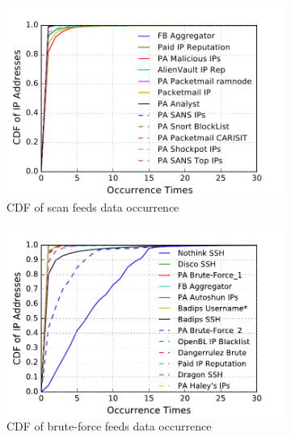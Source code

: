 \begin{figure}[t!]
\centering
\begin{subfigure}{0.33\textwidth}
\includegraphics[width=\linewidth]{images/scan_occurrence.pdf}
\caption{CDF of scan feeds data occurrence}
\label{fig:scan_occurrence}
\end{subfigure}\hspace*{\fill}
\begin{subfigure}{0.33\textwidth}
\includegraphics[width=\linewidth]{images/brute_occurrence.pdf}
\caption{CDF of brute-force feeds data occurrence}
\label{fig:brute_occurrence}
\end{subfigure}\hspace*{\fill}
\begin{subfigure}{0.33\textwidth}

\end{subfigure}
\end{figure}
